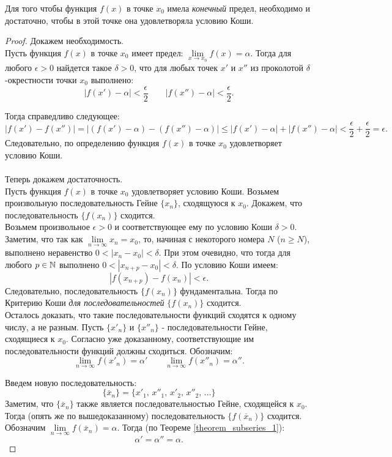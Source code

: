 \begin{theorem}
Для того чтобы функция \(f(x)\) в точке \(x_{0}\) имела \textit{конечный} предел,
необходимо и достаточно, чтобы в этой точке она удовлетворяла условию Коши.

\begin{proof}
Докажем необходимость. \\
Пусть функция \(f(x)\) в точке \(x_{0}\) имеет предел:
\(\lim\limits_{x\to x_{0}} f(x) = \alpha\). Тогда для любого \(\epsilon > 0\) найдется
такое \(\delta > 0\), что для любых точек \(x'\) и \(x''\) из проколотой \(\delta\)-окрестности
точки \(x_{0}\) выполнено:
\[
|f(x') - \alpha| < \frac{\epsilon}{2} \qquad |f(x'') - \alpha| < \frac{\epsilon}{2}.
\]

Тогда справедливо следующее:
\[
|f(x') - f(x'')| = |(f(x') - \alpha) - (f(x'') - \alpha)| \leq
|f(x') - \alpha| + |f(x'') - \alpha| < \frac{\epsilon}{2} + \frac{\epsilon}{2} = \epsilon.
\]
Следовательно, по определению функция \(f(x)\) в точке \(x_{0}\) удовлетворяет условию Коши.\\
\\
Теперь докажем достаточность.\\
Пусть функция \(f(x)\) в точке \(x_{0}\) удовлетворяет условию Коши.
Возьмем произвольную последовательность Гейне \(\{x_{n}\}\), сходящуюся к \(x_{0}\).
Докажем, что последовательность \(\{f(x_{n})\}\) сходится.\\
Возьмем произвольное \(\epsilon > 0\) и соответствующее ему по условию Коши \(\delta > 0\).
Заметим, что так как \(\lim\limits_{ n \to \infty } x_{n} = x_{0}\), то, начиная с некоторого номера
\(N\) (\(n \geq N\)), выполнено неравенство \(0 < |x_{n} - x_{0}| < \delta\).
При этом очевидно, что тогда для любого \(p \in \mathbb{N}\) выполнено
\(0 < |x_{n+p} - x_{0}| < \delta\). По условию Коши имеем:
\[
|f(x_{n+p}) - f(x_{n})| < \epsilon.
\]
Следовательно, последовательность \(\{f(x_{n})\}\) фундаментальна.
Тогда по Критерию Коши \textit{для последовательностей} \(\{f(x_{n})\}\) сходится.\\

Осталось доказать, что такие последовательности функций сходятся к одному числу,
а не разным.
Пусть \(\{x'_{n}\}\) и \(\{x''_{n}\}\) - последовательности Гейне, сходящиеся
к \(x_{0}\). Согласно уже доказанному, соответствующие им последовательности функций
должны сходиться. Обозначим:
\[
\lim_{ n \to \infty } f(x'_{n}) = \alpha' \qquad \lim_{ n \to \infty } f(x''_{n}) = \alpha''.
\]

Введем новую последовательность:
\[
\{\overset{\_}{x}_{n}\} = \{x'_{1}, \, x''_{1}, \, x'_{2}, \, x''_{2}, \, \dots\}
\]
Заметим, что \(\{\overset{\_}{x}_{n}\}\) также является последовательностью Гейне,
сходящейся к \(x_{0}\).
Тогда (опять же по вышедоказанному) последовательность \(\{f(\overset{\_}{x}_{n})\}\) сходится.
Обозначим \(\lim\limits_{n \to \infty} f(\overset{\_}{x}_{n}) = \alpha\).
Тогда (по Теореме \ref{theorem_subseries_1}):
\[
\alpha' = \alpha'' = \alpha.
\]


\end{proof}
\end{theorem}
